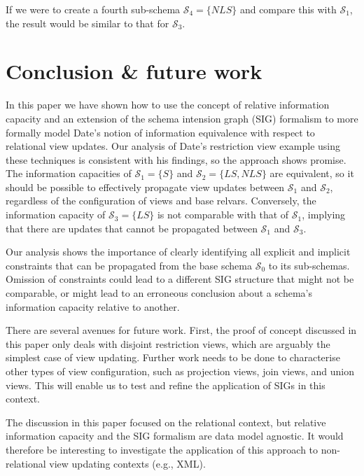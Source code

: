 \documentclass{sig-alternate-05-2015}
\newcounter{constraint}
\newcommand{\LS}{\ensuremath{\mathit{LS}}}
\newcommand{\NLS}{\ensuremath{\mathit{NLS}}}
\newcommand{\SC}[1]{\ensuremath{\mathcal{S}_{#1}}}
\begin{document}
If we were to create a fourth sub-schema \(\SC{4} = \{\NLS\}\) and compare this with \(\SC{1}\), the result would be similar to that for \(\SC{3}\).




\section{Conclusion \& future work}
\label{sec-conclusion}

\noindent In this paper we have shown how to use the concept of relative information capacity and an extension of the schema intension graph (SIG) formalism to more formally model Date's notion of information equivalence with respect to relational view updates. Our analysis of Date's restriction view example \cite{Date.C-2013a-View} using these techniques is consistent with his findings, so the approach shows promise. The information capacities of \(\SC{1} = \{S\}\) and \(\SC{2} = \{\LS,\NLS\}\) are equivalent, so it should be possible to effectively propagate view updates between \(\SC{1}\) and \(\SC{2}\), regardless of the configuration of views and base relvars. Conversely, the information capacity of \(\SC{3} = \{\LS\}\) is not comparable with that of \(\SC{1}\), implying that there are updates that cannot be propagated between \(\SC{1}\) and \(\SC{3}\).

Our analysis shows the importance of clearly identifying all explicit and implicit constraints that can be propagated from the base schema \(\SC{0}\) to its sub-schemas. Omission of constraints could lead to a different SIG structure that might not be comparable, or might lead to an erroneous conclusion about a schema's information capacity relative to another.

There are several avenues for future work. First, the proof of concept discussed in this paper only deals with disjoint restriction views, which are arguably the simplest case of view updating. Further work needs to be done to characterise other types of view configuration, such as projection views, join views, and union views. This will enable us to test and refine the application of SIGs in this context.

The discussion in this paper focused on the relational context, but relative information capacity and the SIG formalism are data model agnostic. It would therefore be interesting to investigate the application of this approach to non-relational view updating contexts (e.g., XML).
\end{document}
